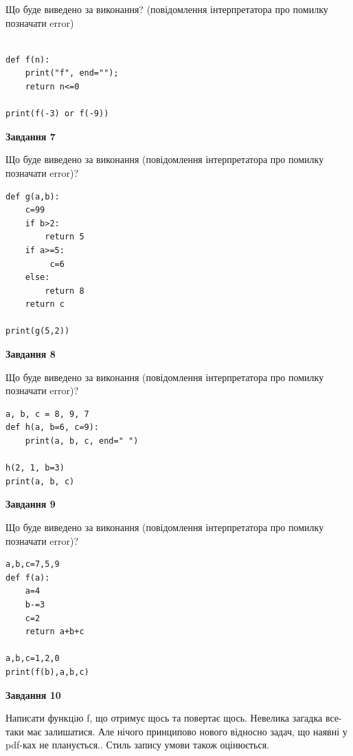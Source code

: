 \documentclass[12pt, ukrainian]{article}
\begin{document}
{\begin {large}
Що буде виведено за виконання? (повідомлення інтерпретатора про помилку позначати error)\par
\begin{verbatim}

def f(n):
    print("f", end="");
    return n<=0

print(f(-3) or f(-9))
\end{verbatim}

{\begin {center}\textbf{Завдання 7}\end {center}}

Що буде виведено за виконання (повідомлення інтерпретатора про помилку позначати error)?\par
\begin{verbatim}
def g(a,b):
    c=99
    if b>2:
        return 5
    if a>=5:
         c=6
    else: 
        return 8
    return c

print(g(5,2))
\end{verbatim}

{\begin {center}\textbf{Завдання 8}\end {center}}

Що буде виведено за виконання (повідомлення інтерпретатора про помилку позначати error)?\par
\begin{verbatim}
a, b, c = 8, 9, 7
def h(a, b=6, c=9):
    print(a, b, c, end=" ")

h(2, 1, b=3)
print(a, b, c)
\end{verbatim}

{\begin {center}\textbf{Завдання 9}\end {center}}

Що буде виведено за виконання (повідомлення інтерпретатора про помилку позначати error)?\par
\begin{verbatim}
a,b,c=7,5,9
def f(a):
    a=4
    b-=3
    c=2
    return a+b+c

a,b,c=1,2,0
print(f(b),a,b,c)
\end{verbatim}

{\begin {center}\textbf{Завдання 10}\end {center}}


Написати функцiю f, що отримує щось та повертає щось. Невелика загадка все-таки має залишатися. Але нічого принципово нового відносно задач, що наявні у pdf-ках не планується.. Стиль запису умови також оцінюється.\par
\end {large}}
\newpage
\end{document}
